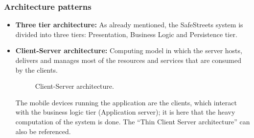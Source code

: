 \subsubsection{Architecture patterns}
\begin{itemize}
    \item 
    \textbf{Three tier architecture:} As already mentioned, the SafeStreets system is divided into three tiers: Presentation, Business Logic and Persistence tier.
    \item
    \textbf{Client-Server architecture:} Computing model in which the server hosts, delivers and manages most of the resources and services that are consumed by the clients.

    \begin{figure}[H]
    \centering
    \caption{\label{fig:client-server}Client-Server architecture.}
    \end{figure}

    The mobile devices running the application are the clients, which interact with the business logic tier (Application server); it is here that the heavy computation of the system is done. The “Thin Client Server architecture” can also be referenced.
\end{itemize}

